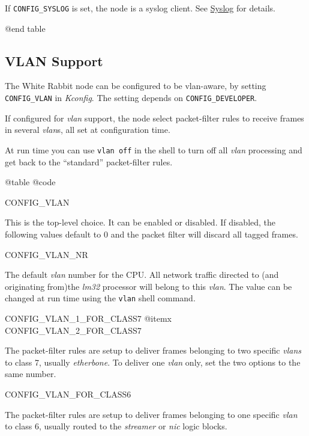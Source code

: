 \documentclass[a4paper, 12pt]{article}
\newcommand{\link}[1]{\hyperref[#1]{#1}}
\begin{document}
	If \texttt{CONFIG\_SYSLOG} is set, the node is a syslog client.
        See \link{Syslog} for details.

@end table

\label{VLAN Support}
\subsection{VLAN Support}

The White Rabbit node can be configured to be vlan-aware, by setting
\texttt{CONFIG\_VLAN} in \textit{Kconfig}.  The setting depends on \texttt{CONFIG\_DEVELOPER}.

If configured for \textit{vlan} support, the node select packet-filter rules
to receive frames in several \textit{vlan}s, all set at configuration time.

At run time you can use \texttt{vlan off} in the shell to turn off all \textit{vlan}
processing and get back to the ``standard'' packet-filter rules.

@table @code

\item CONFIG\_VLAN

	This is the top-level choice. It can be enabled or disabled.
        If disabled, the following values default to 0 and the
        packet filter will discard all tagged frames.

\item CONFIG\_VLAN\_NR

	The default \textit{vlan} number for the CPU.  All network traffic
        directed to (and originating from)the \textit{lm32} processor will
        belong to this \textit{vlan}.  The value can be changed at run time
        using the \texttt{vlan} shell command.

\item CONFIG\_VLAN\_1\_FOR\_CLASS7
@itemx CONFIG\_VLAN\_2\_FOR\_CLASS7

	The packet-filter rules are setup to deliver frames belonging
        to two specific \textit{vlans} to class 7, usually \textit{etherbone}.
        To deliver one \textit{vlan} only, set the two options to the same
        number.

\item CONFIG\_VLAN\_FOR\_CLASS6

	The packet-filter rules are setup to deliver frames belonging
        to one specific \textit{vlan} to class 6, usually routed to the
        \textit{streamer} or \textit{nic} logic blocks.
\end{document}
